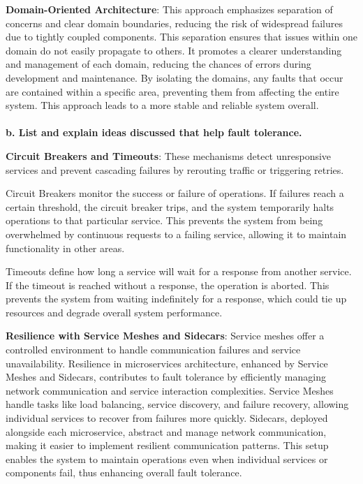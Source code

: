 \documentclass[12pt]{article}
\numberwithin{table}{section}
\begin{document}
	\textbf{Domain-Oriented Architecture}: This approach emphasizes separation of concerns and clear domain boundaries, reducing the risk of widespread failures due to tightly coupled components. This separation ensures that issues within one domain do not easily propagate to others. It promotes a clearer understanding and management of each domain, reducing the chances of errors during development and maintenance. By isolating the domains, any faults that occur are contained within a specific area, preventing them from affecting the entire system. This approach leads to a more stable and reliable system overall.\\
	\\
	\textbf{b. List and explain ideas discussed that help fault tolerance.}
	
	\textbf{Circuit Breakers and Timeouts}: These mechanisms detect unresponsive services and prevent cascading failures by rerouting traffic or triggering retries. 
	
	Circuit Breakers monitor the success or failure of operations. If failures reach a certain threshold, the circuit breaker trips, and the system temporarily halts operations to that particular service. This prevents the system from being overwhelmed by continuous requests to a failing service, allowing it to maintain functionality in other areas. 
	
	Timeouts define how long a service will wait for a response from another service. If the timeout is reached without a response, the operation is aborted. This prevents the system from waiting indefinitely for a response, which could tie up resources and degrade overall system performance.
	
	\textbf{Resilience with Service Meshes and Sidecars}: Service meshes offer a controlled environment to handle communication failures and service unavailability. Resilience in microservices architecture, enhanced by Service Meshes and Sidecars, contributes to fault tolerance by efficiently managing network communication and service interaction complexities. Service Meshes handle tasks like load balancing, service discovery, and failure recovery, allowing individual services to recover from failures more quickly. Sidecars, deployed alongside each microservice, abstract and manage network communication, making it easier to implement resilient communication patterns. This setup enables the system to maintain operations even when individual services or components fail, thus enhancing overall fault tolerance.
	
\end{document}
